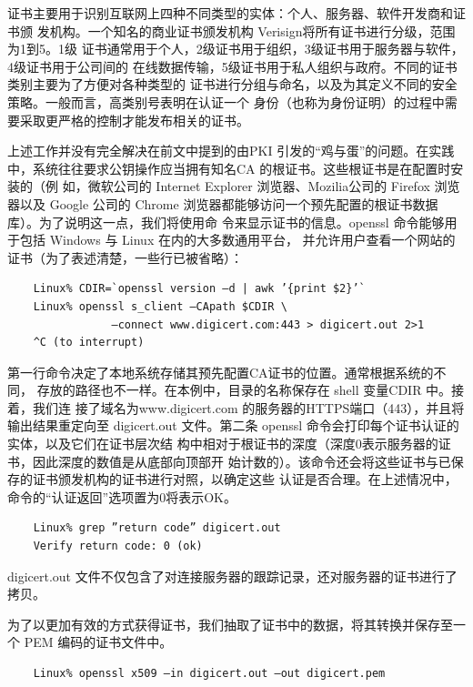 证书主要用于识别互联网上四种不同类型的实体：个人、服务器、软件开发商和证书颁
发机构。一个知名的商业证书颁发机构 Verisign将所有证书进行分级，范围为1到5。1级
证书通常用于个人，2级证书用于组织，3级证书用于服务器与软件，4级证书用于公司间的
在线数据传输，5级证书用于私人组织与政府。不同的证书类别主要为了方便对各种类型的
证书进行分组与命名，以及为其定义不同的安全策略。一般而言，高类别号表明在认证一个
身份（也称为身份证明）的过程中需要采取更严格的控制才能发布相关的证书。

上述工作并没有完全解决在前文中提到的由PKI 引发的“鸡与蛋”的问题。在实践
中，系统往往要求公钥操作应当拥有知名CA 的根证书。这些根证书是在配置时安装的（例
如，微软公司的 Internet Explorer 浏览器、Mozilia公司的 Firefox 浏览器以及 Google 公司的
Chrome 浏览器都能够访问一个预先配置的根证书数据库）。为了说明这一点，我们将使用命
令来显示证书的信息。openssl 命令能够用于包括 Windows 与 Linux 在内的大多数通用平台，
并允许用户查看一个网站的证书（为了表述清楚，一些行已被省略）：
\begin{verbatim}
    Linux% CDIR=`openssl version –d | awk ’{print $2}’`
    Linux% openssl s_client –CApath $CDIR \
                –connect www.digicert.com:443 > digicert.out 2>1
    ^C (to interrupt)
\end{verbatim}
第一行命令决定了本地系统存储其预先配置CA证书的位置。通常根据系统的不同，
存放的路径也不一样。在本例中，目录的名称保存在 shell 变量CDIR 中。接着，我们连
接了域名为www.digicert.com 的服务器的HTTPS端口（443），并且将输出结果重定向至
digicert.out 文件。第二条 openssl 命令\footnotemark 会打印每个证书认证的实体，以及它们在证书层次结
构中相对于根证书的深度（深度0表示服务器的证书，因此深度的数值是从底部向顶部开
始计数的）。该命令还会将这些证书与已保存的证书颁发机构的证书进行对照，以确定这些
认证是否合理。在上述情况中，命令的“认证返回”选项置为0将表示OK。

\begin{verbatim}
    Linux% grep ”return code” digicert.out
    Verify return code: 0 (ok)
\end{verbatim}

digicert.out 文件不仅包含了对连接服务器的跟踪记录，还对服务器的证书进行了拷贝。

为了以更加有效的方式获得证书，我们抽取了证书中的数据，将其转换并保存至一个 PEM
编码的证书文件中。

\begin{verbatim}
    Linux% openssl x509 –in digicert.out –out digicert.pem
\end{verbatim}

